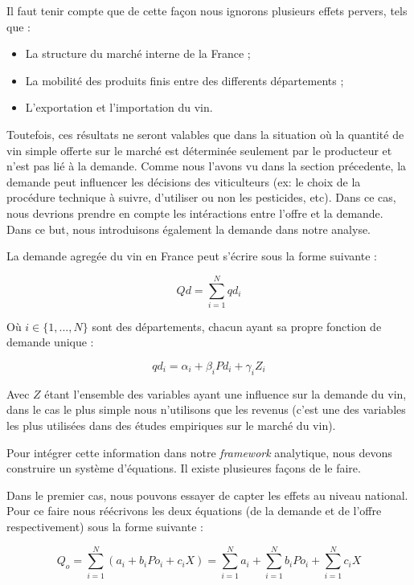 \documentclass[11pt,]{article}
\providecommand{\tightlist}{%
  \setlength{\itemsep}{0pt}\setlength{\parskip}{0pt}}
\begin{document}
Il faut tenir compte que de cette façon nous ignorons plusieurs effets
pervers, tels que :

\begin{itemize}
\tightlist
\item
  La structure du marché interne de la France ;
\item
  La mobilité des produits finis entre des differents départements ;
\item
  L'exportation et l'importation du vin.
\end{itemize}

Toutefois, ces résultats ne seront valables que dans la situation où la
quantité de vin simple offerte sur le marché est déterminée seulement
par le producteur et n'est pas lié à la demande. Comme nous l'avons vu
dans la section précedente, la demande peut influencer les décisions des
viticulteurs (ex: le choix de la procédure technique à suivre,
d'utiliser ou non les pesticides, etc). Dans ce cas, nous devrions
prendre en compte les intéractions entre l'offre et la demande. Dans ce
but, nous introduisons également la demande dans notre analyse.

La demande agregée du vin en France peut s'écrire sous la forme suivante
:

\begin{equation*}
    Qd = \sum_{i = 1}^{N} qd_i 
\end{equation*}

Où \(i \in \{1, ..., N\}\) sont des départements, chacun ayant sa propre
fonction de demande unique :

\begin{equation*}
    qd_i = \alpha_i + \beta_i Pd_i + \gamma_i Z_i 
\end{equation*}

Avec \(Z\) étant l'ensemble des variables ayant une influence sur la
demande du vin, dans le cas le plus simple nous n'utilisons que les
revenus (c'est une des variables les plus utilisées dans des études
empiriques sur le marché du vin).

Pour intégrer cette information dans notre \emph{framework} analytique,
nous devons construire un système d'équations. Il existe plusieures
façons de le faire.

Dans le premier cas, nous pouvons essayer de capter les effets au niveau
national. Pour ce faire nous réécrivons les deux équations (de la
demande et de l'offre respectivement) sous la forme suivante :

\begin{equation*}
    Q_o = \sum_{i = 1}^{N} (a_i + b_i Po_i + c_i X) = \sum_{i = 1}^{N} a_i + \sum_{i = 1}^{N} b_i Po_i + \sum_{i = 1}^{N} c_i X
\end{equation*}
\end{document}
